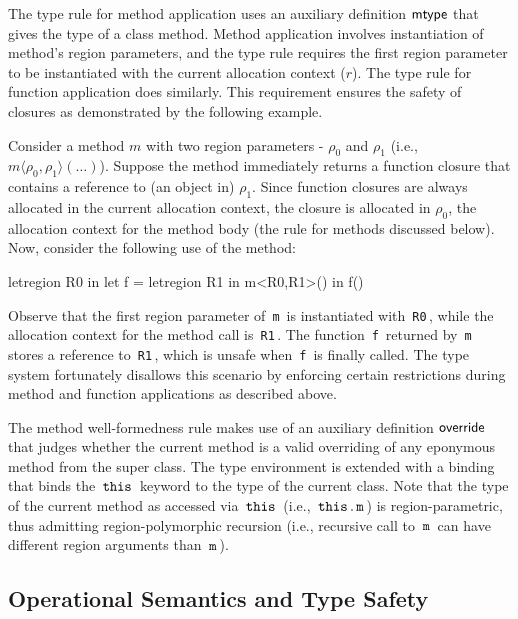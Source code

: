 \documentclass[a4paper,UKenglish]{lipics-v2018}
\newcommand{\C}[1]{\code{#1}}
\newcommand{\code}[1]{\,{\tt #1}\,}
\newcommand{\thisZ}{\C{this}}
\newcommand{\inang}[1]{\langle #1 \rangle}
\newcommand{\mtype}{{\sf mtype}}
\newcommand{\override}{{\sf override}}
\begin{document}
The type rule for method application uses an auxiliary definition
$\mtype$ that gives the type of a class method. Method application
involves instantiation of method's region parameters, and the type
rule requires the first region parameter to be instantiated with the
current allocation context ($r$). The type rule for function
application does similarly.  This requirement ensures the safety of
closures as demonstrated by the following example.

Consider a method $m$ with two region parameters - $\rho_0$ and
$\rho_1$ (i.e., $m\inang{\rho_0,\rho_1}(\dots)$). Suppose the method
immediately returns a function closure that contains a reference to
(an object in) $\rho_1$. Since function closures are always allocated
in the current allocation context, the closure is allocated in
$\rho_0$, the allocation context for the method body (the rule for
methods discussed below). Now, consider the following use of the
method:
\begin{codejava}
letregion R0 in
  let f = letregion R1 in m<R0,R1>()
  in f()
\end{codejava}
Observe that the first region parameter of \C{m} is instantiated with
\C{R0}, while the allocation context for the method call is \C{R1}.
The function \C{f} returned by \C{m} stores a reference to \C{R1},
which is unsafe when \C{f} is finally called. The type system
fortunately disallows this scenario by enforcing certain restrictions
during method and function applications as described above.

The method well-formedness rule makes use of an auxiliary definition
$\override$ that judges whether the current method is a valid
overriding of any eponymous method from the super class. The type
environment is extended with a binding that binds the $\thisZ$ keyword
to the type of the current class. Note that the type of the
current method as accessed via $\thisZ$ (i.e., $\thisZ.\C{m}$) is
region-parametric, thus admitting region-polymorphic recursion (i.e.,
recursive call to $\C{m}$ can have different region arguments than
$\C{m}$). 

\subsection{Operational Semantics and Type Safety}
\label{sec:fb-opsem}
\end{document}
